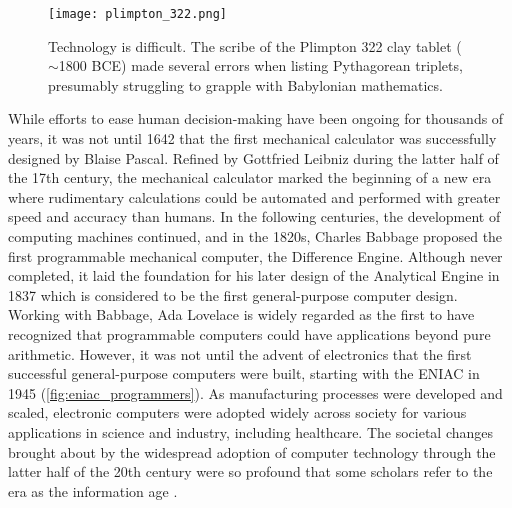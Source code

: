 \begin{figure}[t]
    \centering
    \texttt{[image: plimpton\_322.png]}
    \caption[Technology is difficult. The scribe of the Plimpton 322 clay tablet ($\sim$1800 BCE) made several errors when listing Pythagorean triplets.]{Technology is difficult. The scribe of the Plimpton 322 clay tablet ($\sim$1800 BCE) made several errors when listing Pythagorean triplets, presumably struggling to grapple with Babylonian mathematics. \parencite[photo credit][]{neugebauer_mathematical_1945}}
    \label{fig:plimpton_332}
\end{figure}

While efforts to ease human decision-making have been ongoing for thousands of years, it was not until 1642 that the first mechanical calculator was successfully designed by Blaise Pascal. Refined by Gottfried Leibniz during the latter half of the 17th century, the mechanical calculator marked the beginning of a new era where rudimentary calculations could be automated and performed with greater speed and accuracy than humans. 
In the following centuries, the development of computing machines continued, and in the 1820s, Charles Babbage proposed the first programmable mechanical computer, the Difference Engine. Although never completed, it laid the foundation for his later design of the Analytical Engine in 1837 which is considered to be the first general-purpose computer design. 
Working with Babbage, Ada Lovelace is widely regarded as the first to have recognized that programmable computers could have applications beyond pure arithmetic. However, it was not until the advent of electronics that the first successful general-purpose computers were built, starting with the ENIAC in 1945 (\cref{fig:eniac_programmers}).
As manufacturing processes were developed and scaled, electronic computers were adopted widely across society for various applications in science and industry, including healthcare. 
The societal changes brought about by the widespread adoption of computer technology through the latter half of the 20th century were so profound that some scholars refer to the era as the information age \parencite{georges_universal_2001, harari_sapiens_2011}.


